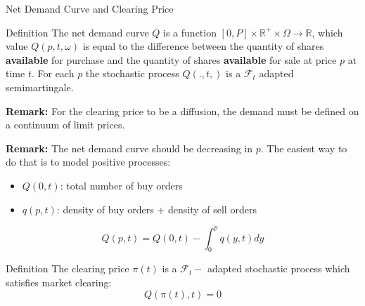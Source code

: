 \documentclass{beamer}
\begin{document}
\begin{frame}[shrink=38]{{\color{cyan}Net Demand Curve and Clearing Price}}
\bigskip
\begin{block}{Definition}
The net demand curve $Q$ is a function $[0,P]\times \mathbb{R}^{+}\times \Omega \mathbb{\rightarrow R}$, which value $Q(p,t,\omega )$ is equal to the difference between the quantity of shares \textbf{available} for purchase and the quantity of shares \textbf{available} for sale at price $p$ at time $t$. For each $p$ the stochastic process $Q(.,t,)$ is a $\mathcal{F}_{t}$ adapted semimartingale.
\end{block}

{\color{magenta}\textbf{Remark:}} For the clearing price to be a diffusion, the demand must be defined on a continuum of limit prices.

\vspace{5pt}
{\color{magenta}\textbf{Remark:}} The net demand curve should be decreasing in $p$. The easiest way to do that is to model positive processes:
\begin{itemize}
\item $Q(0,t)$: total number of buy orders
\item $q(p,t)$: density of buy orders + density of sell orders
\end{itemize}
\begin{equation*}
Q(p,t)=Q(0,t)-\int_{0}^{p}q(y,t)dy
\end{equation*}

\begin{block}{Definition}
The clearing price $\pi (t)$ is a $\mathcal{F}_{t}-$ adapted stochastic process which satisfies market clearing:
\vspace{-8pt}
\begin{equation*}
Q(\pi (t),t)=0
\end{equation*}
\end{block}

\end{frame}
\end{document}
